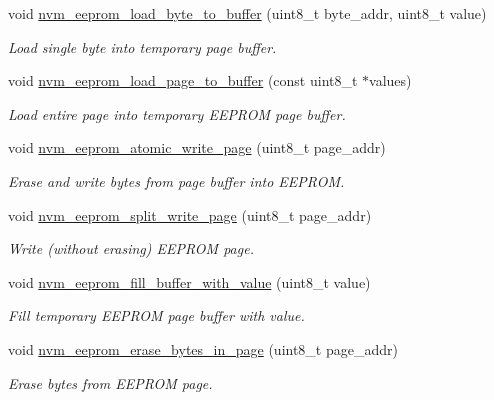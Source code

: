 \begin{DoxyCompactItemize}
void \hyperlink{group__nvm__eeprom__group_ga47aaaec22fa50f0cfb90657357885fa9}{nvm\-\_\-eeprom\-\_\-load\-\_\-byte\-\_\-to\-\_\-buffer} (uint8\-\_\-t byte\-\_\-addr, uint8\-\_\-t value)
\begin{DoxyCompactList}\small\item\em Load single byte into temporary page buffer. \end{DoxyCompactList}\item 
void \hyperlink{group__nvm__eeprom__group_ga02f10adbf959b8525bbaf777ad6e43b6}{nvm\-\_\-eeprom\-\_\-load\-\_\-page\-\_\-to\-\_\-buffer} (const uint8\-\_\-t $\ast$values)
\begin{DoxyCompactList}\small\item\em Load entire page into temporary E\-E\-P\-R\-O\-M page buffer. \end{DoxyCompactList}\item 
void \hyperlink{group__nvm__eeprom__group_ga6f939f98287b320d39418ed72ba8cfe1}{nvm\-\_\-eeprom\-\_\-atomic\-\_\-write\-\_\-page} (uint8\-\_\-t page\-\_\-addr)
\begin{DoxyCompactList}\small\item\em Erase and write bytes from page buffer into E\-E\-P\-R\-O\-M. \end{DoxyCompactList}\item 
void \hyperlink{group__nvm__eeprom__group_gae8b5ca90e2d370109bed6e6adc8d9307}{nvm\-\_\-eeprom\-\_\-split\-\_\-write\-\_\-page} (uint8\-\_\-t page\-\_\-addr)
\begin{DoxyCompactList}\small\item\em Write (without erasing) E\-E\-P\-R\-O\-M page. \end{DoxyCompactList}\item 
void \hyperlink{group__nvm__eeprom__group_ga6228a0fc4ddfe85c4b6c7b032f81e0df}{nvm\-\_\-eeprom\-\_\-fill\-\_\-buffer\-\_\-with\-\_\-value} (uint8\-\_\-t value)
\begin{DoxyCompactList}\small\item\em Fill temporary E\-E\-P\-R\-O\-M page buffer with value. \end{DoxyCompactList}\item 
void \hyperlink{group__nvm__eeprom__group_gaf2f736b02cc1a2d7e27f45d0d5cc9bcb}{nvm\-\_\-eeprom\-\_\-erase\-\_\-bytes\-\_\-in\-\_\-page} (uint8\-\_\-t page\-\_\-addr)
\begin{DoxyCompactList}\small\item\em Erase bytes from E\-E\-P\-R\-O\-M page. \end{DoxyCompactList}\item 

\end{DoxyCompactItemize}
